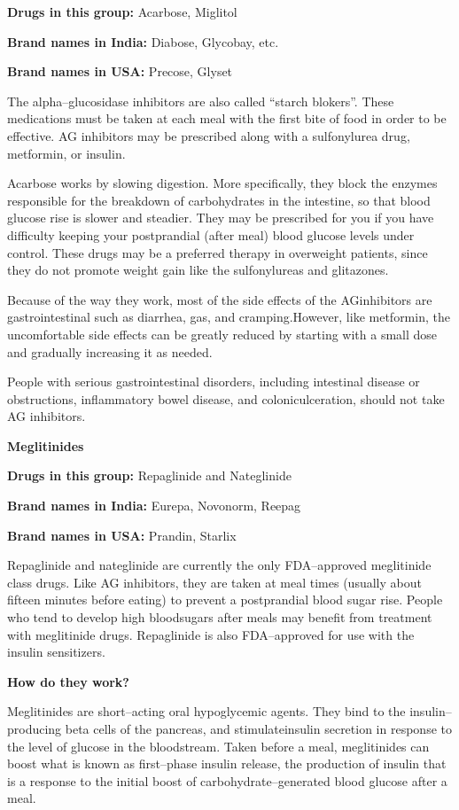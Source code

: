 \textbf{Drugs in this group:} Acarbose, Miglitol

\textbf{Brand names in India:} Diabose, Glycobay, etc.

\textbf{Brand names in USA:} Precose, Glyset

The alpha–glucosidase inhibitors are also called “starch blokers”. These medications must be taken at each meal with the first bite of food in order to be effective. AG inhibitors may be prescribed along with a sulfonylurea drug, metformin, or insulin.

Acarbose works by slowing digestion. More specifically, they block the enzymes responsible for the breakdown of carbohydrates in the intestine, so that blood glucose rise is slower and steadier. They may be prescribed for you if you have difficulty keeping your postprandial (after meal) blood glucose levels under control. These drugs may be a preferred therapy in overweight patients, since they do not promote weight gain like the sulfonylureas and glitazones.

Because of the way they work, most of the side effects of the AG\break inhibitors are gastrointestinal such as diarrhea, gas, and cramping.\break However, like metformin, the uncomfortable side effects can be greatly reduced by starting with a small dose and gradually increasing it as needed.

People with serious gastrointestinal disorders, including intestinal disease or obstructions, inflammatory bowel disease, and colonic\break ulceration, should not take AG inhibitors.

\textbf{Meglitinides}

\textbf{Drugs in this group:} Repaglinide and Nateglinide

\textbf{Brand names in India:} Eurepa, Novonorm, Reepag

\textbf{Brand names in USA:} Prandin, Starlix

Repaglinide and nateglinide are currently the only FDA–approved meglitinide class drugs. Like AG inhibitors, they are taken at meal times (usually about fifteen minutes before eating) to prevent a postprandial blood sugar rise. People who tend to develop high blood\break sugars after meals may benefit from treatment with meglitinide drugs. Repaglinide is also FDA–approved for use with the insulin sensitizers.

\noindent\textbf{How do they work?}

Meglitinides are short–acting oral hypoglycemic agents. They bind to the insulin–producing beta cells of the pancreas, and stimulate\break insulin secretion in response to the level of glucose in the bloodstream. Taken before a meal, meglitinides can boost what is known as first–phase insulin release, the production of insulin that is a response to the initial boost of carbohydrate–generated blood glucose after a meal.

